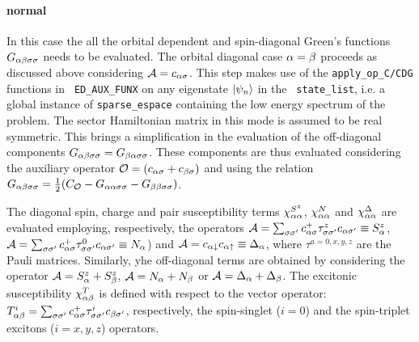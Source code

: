 \documentclass[edipack2.tex]{subfiles}
\begin{document}
\paragraph{{\bf normal}}
In this case the all the orbital dependent and spin-diagonal Green's
functions $G_{\alpha\beta\sigma\sigma}$ needs to be evaluated. The orbital diagonal case
$\alpha=\beta$ proceeds as discussed above considering ${\cal A}=c_{\alpha\sigma}$. This
step makes use of the {\tt apply\_op\_C/CDG} functions in {\tt
  ED\_AUX\_FUNX} on any eigenstate $|\psi_n\rangle$ in the {\tt
  state\_list}, i.e. a global instance of {\tt sparse\_espace}
containing the low energy spectrum of the problem.
The sector Hamiltonian matrix in this mode is assumed to be real
symmetric. This brings a simplification in the evaluation of the
off-diagonal components $G_{\alpha\beta\sigma\sigma}=G_{\beta\alpha\sigma\sigma}$.
These components are thus evaluated considering the auxiliary operator
${\cal O}=(c_{\alpha\sigma} + c_{\beta\sigma})$ and using the relation
$G_{\alpha\beta\sigma\sigma}=\tfrac{1}{2}(C_{\cal O} - G_{\alpha\alpha\sigma\sigma} - G_{\beta\beta\sigma\sigma})$.

The diagonal spin, charge and pair susceptibility terms
$\chi^{S^z}_{\alpha\alpha}$, $\chi^N_{\alpha\alpha}$ and $\chi^\Delta_{\alpha\alpha}$ are
evaluated employing, respectively, the operators ${\cal A}=\sum_{\sigma\sigma'}c^+_{\alpha\sigma}\tau^z_{\sigma\sigma'}c_{\alpha\sigma'}\equiv
S^z_\alpha$, ${\cal A}=\sum_{\sigma\sigma'}c^+_{\alpha\sigma}\tau^0_{\sigma\sigma'}c_{\alpha\sigma'}\equiv
N_\alpha$) and ${\cal A}=c_{\alpha\downarrow}c_{\alpha\uparrow}\equiv
\Delta_\alpha$, where
$\tau^{a=0,x,y,z}$ are the Pauli matrices.
Similarly, yhe off-diagonal terms are obtained by considering the operator ${\cal A}=S^z_\alpha
+ S^z_\beta$, ${\cal A}=N_\alpha + N_\beta$ or ${\cal A}=\Delta_\alpha + \Delta_\beta$. 
The excitonic susceptibility $\chi^T_{\alpha\beta}$ is defined with respect
to the vector operator: $T^i_{\alpha\beta} = \sum_{\sigma\sigma'}
c^+_{\alpha\sigma}\tau^i_{\sigma\sigma'}c_{\beta\sigma'}$, respectively, the spin-singlet
($i=0$) and the spin-triplet excitons ($i=x,y,z$) operators.
\end{document}
